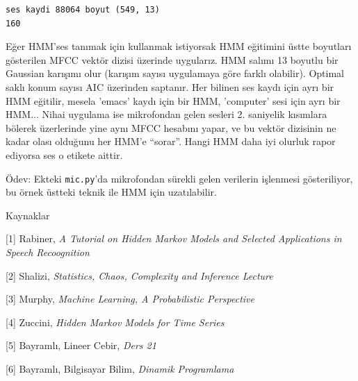 \documentclass[12pt,fleqn]{article}\usepackage{../../common}
\begin{document}
\begin{verbatim}
ses kaydi 88064 boyut (549, 13)
160
\end{verbatim}

Eğer HMM'ses tanımak için kullanmak istiyorsak HMM eğitimini üstte
boyutları gösterilen MFCC vektör dizisi üzerinde uygularız. HMM salımı 13
boyutlu bir Gaussian karışımı olur (karışım sayısı uygulamaya göre farklı
olabilir). Optimal saklı konum sayısı AIC üzerinden saptanır. Her bilinen
ses kaydı için ayrı bir HMM eğitilir, mesela 'emacs' kaydı için bir HMM,
'computer' sesi için ayrı bir HMM... Nihai uygulama ise mikrofondan gelen
sesleri 2. saniyelik kısımlara bölerek üzerlerinde yine aynı MFCC hesabını
yapar, ve bu vektör dizisinin ne kadar olası olduğunu her HMM'e
``sorar''. Hangi HMM daha iyi olurluk rapor ediyorsa ses o etikete aittir.

Ödev: Ekteki \verb!mic.py!'da mikrofondan sürekli gelen verilerin işlenmesi
gösteriliyor, bu örnek üstteki teknik ile HMM için uzatılabilir.


Kaynaklar 

[1] Rabiner, {\em A Tutorial on Hidden Markov Models and Selected Applications in Speech
Recoognition}

[2] Shalizi, {\em Statistics, Chaos, Complexity and Inference Lecture}

[3] Murphy, {\em Machine Learning, A Probabilistic Perspective}

[4] Zuccini, {\em Hidden Markov Models for Time Series}

[5] Bayramlı, Lineer Cebir, {\em Ders 21}

[6] Bayramlı, Bilgisayar Bilim, {\em Dinamik Programlama}
\end{document}
